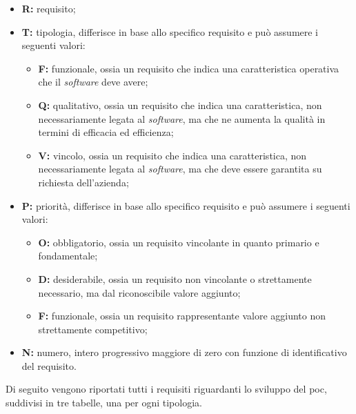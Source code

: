 \begin{itemize}
	\item \textbf{R:} requisito;
	
	\item \textbf{T:} tipologia, differisce in base allo specifico requisito e può assumere i seguenti valori:
		\begin{itemize}
			\item \textbf{F:} funzionale, ossia un requisito che indica una caratteristica operativa che il \textit{software} deve avere;
			\item \textbf{Q:} qualitativo, ossia un requisito che indica una caratteristica, non necessariamente legata al \textit{software}, ma che ne aumenta la qualità in termini di efficacia ed efficienza;
			\item \textbf{V:} vincolo, ossia un requisito che indica una caratteristica, non necessariamente legata al \textit{software}, ma che deve essere garantita su richiesta dell'azienda;
		\end{itemize}
	
	\item \textbf{P:} priorità, differisce in base allo specifico requisito e può assumere i seguenti valori:
		\begin{itemize}
			\item \textbf{O:} obbligatorio, ossia un requisito vincolante in quanto primario e fondamentale;
			\item \textbf{D:} desiderabile, ossia un requisito non vincolante o strettamente necessario, ma dal riconoscibile valore aggiunto;
			\item \textbf{F:} funzionale, ossia un requisito rappresentante valore aggiunto non strettamente competitivo; 
		\end{itemize}
	
	\item \textbf{N:} numero, intero progressivo maggiore di zero con funzione di identificativo del requisito.
\end{itemize}
Di seguito vengono riportati tutti i requisiti riguardanti lo sviluppo del \gls{poc}, suddivisi in tre tabelle, una per ogni tipologia.


